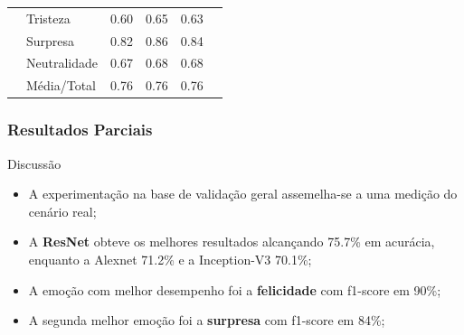 \documentclass{beamer}
\begin{document}
\begin{frame}
\begin{table}[]
\begin{tabular}{llcccc}
                                    & Tristeza     & 0.60     & 0.65      & 0.63     &                                 \\
                                    & Surpresa     & 0.82     & 0.86      & 0.84     &                                 \\
                                    & Neutralidade & 0.67     & 0.68      & 0.68     &                                 \\
                                    & Média/Total  & 0.76     & 0.76      & 0.76     &                                 \\ \hline
\end{tabular}
\end{table} 
\end{frame}





\begin{frame}
\frametitle{Resultados Parciais}
 \begin{block}{Discussão}
\begin{itemize}
\item A experimentação na base de validação geral assemelha-se a uma medição do cenário real;
\item A \textbf{ResNet} obteve os melhores resultados alcançando 75.7\% em acurácia, enquanto a Alexnet 71.2\% e a Inception-V3 70.1\%;
\item A emoção com melhor desempenho foi a \textbf{felicidade} com f1-score em 90\%;
\pause 
\item A segunda melhor emoção foi a \textbf{surpresa} com f1-score em 84\%;
\end{itemize}
\end{block}
\end{frame}
\end{document}
